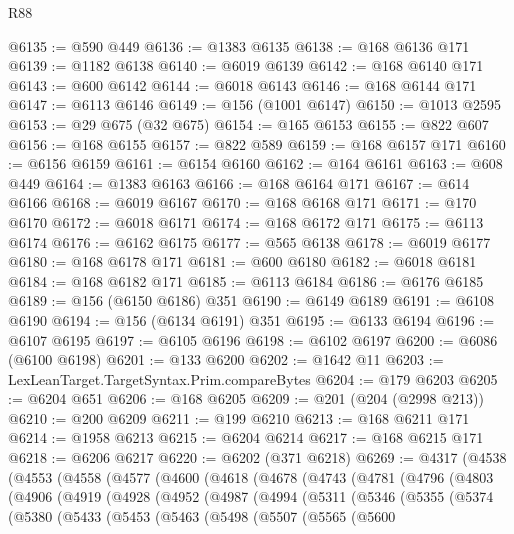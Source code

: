 \begin{lexlean}{R88}
\begin{coremodule}
@6135 := @590 @449
@6136 := @1383 @6135
@6138 := @168 @6136 @171
@6139 := @1182 @6138
@6140 := @6019 @6139
@6142 := @168 @6140 @171
@6143 := @600 @6142
@6144 := @6018 @6143
@6146 := @168 @6144 @171
@6147 := @6113 @6146
@6149 := @156 (@1001 @6147)
@6150 := @1013 @2595
@6153 := @29 @675 (@32 @675)
@6154 := @165 @6153
@6155 := @822 @607
@6156 := @168 @6155
@6157 := @822 @589
@6159 := @168 @6157 @171
@6160 := @6156 @6159
@6161 := @6154 @6160
@6162 := @164 @6161
@6163 := @608 @449
@6164 := @1383 @6163
@6166 := @168 @6164 @171
@6167 := @614 @6166
@6168 := @6019 @6167
@6170 := @168 @6168 @171
@6171 := @170 @6170
@6172 := @6018 @6171
@6174 := @168 @6172 @171
@6175 := @6113 @6174
@6176 := @6162 @6175
@6177 := @565 @6138
@6178 := @6019 @6177
@6180 := @168 @6178 @171
@6181 := @600 @6180
@6182 := @6018 @6181
@6184 := @168 @6182 @171
@6185 := @6113 @6184
@6186 := @6176 @6185
@6189 := @156 (@6150 @6186) @351
@6190 := @6149 @6189
@6191 := @6108 @6190
@6194 := @156 (@6134 @6191) @351
@6195 := @6133 @6194
@6196 := @6107 @6195
@6197 := @6105 @6196
@6198 := @6102 @6197
@6200 := @6086 (@6100 @6198)
@6201 := @133 @6200
@6202 := @1642 @11
@6203 := LexLeanTarget.TargetSyntax.Prim.compareBytes
@6204 := @179 @6203
@6205 := @6204 @651
@6206 := @168 @6205
@6209 := @201 (@204 (@2998 @213))
@6210 := @200 @6209
@6211 := @199 @6210
@6213 := @168 @6211 @171
@6214 := @1958 @6213
@6215 := @6204 @6214
@6217 := @168 @6215 @171
@6218 := @6206 @6217
@6220 := @6202 (@371 @6218)
@6269 := @4317
    (@4538
      (@4553
        (@4558
          (@4577
            (@4600
              (@4618
                (@4678
                  (@4743
                    (@4781
                      (@4796
                        (@4803
                          (@4906
                            (@4919
                              (@4928
                                (@4952
                                  (@4987
                                    (@4994
                                      (@5311
                                        (@5346
                                          (@5355
                                            (@5374
                                              (@5380
                                                (@5433
                                                  (@5453
                                                    (@5463
                                                      (@5498
                                                        (@5507
                                                          (@5565
                                                            (@5600

\end{coremodule}
\end{lexlean}
